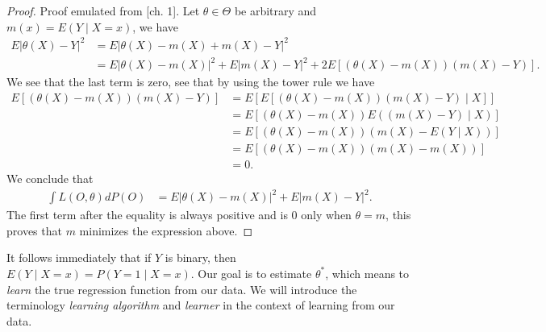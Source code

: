 \documentclass[11pt, a4paper]{article}
\theoremstyle{definition}
\theoremstyle{remark}
\newcommand{\btheta}{\theta}
\begin{document}
\begin{proof}
    Proof emulated from \parencite{gyorfi2002distribution}[ch. 1]. 
    Let $ \btheta \in \Theta $ be arbitrary and $ m(x) = E(Y \mid X = x) $, we have 
    \begin{align*}
        E| \theta(X) - Y |^2 &= E| \theta(X) - m(X) + m(X) - Y |^2 \\
                             &= E| \theta(X) - m(X) |^2 + E| m(X) - Y |^2 + 2 E[ (\theta(X) - m(X))(m(X) - Y) ].
    \end{align*}
    We see that the last term is zero, see that by using the tower rule we have 
    \begin{align*}
        E[ (\theta(X) - m(X))(m(X) - Y) ] &= E[ E[ (\theta(X) - m(X))(m(X) - Y) \mid X] ] \\
                                                       &= E[ (\theta(X) - m(X)) E( (m(X) - Y) \mid X) ] \\
                                                       &= E[ (\theta(X) - m(X)) ( m(X) - E(Y \mid X)) ] \\
                                                       &= E[ (\theta(X) - m(X)) ( m(X) - m(X)) ] \\
                                                       &= 0.
    \end{align*}
    We conclude that
    \begin{align*}
        \int L(O, \theta) d P(O) &= E| \theta(X) - m(X) |^2 + E | m(X) - Y |^2.
    \end{align*}
    The first term after the equality is always positive and is $ 0 $ only when $ \theta = m $, this proves that $ m $ minimizes the expression above. 
\end{proof}
It follows immediately that if $ Y $ is binary, then $ E(Y \mid X = x) = P(Y = 1 \mid X = x) $. Our goal is to estimate $ \btheta^{*} $, which means to \textit{learn} the true regression function from our data. We will introduce the terminology \textit{learning algorithm} and \textit{learner} in the context of learning from our data.  
\end{document}
